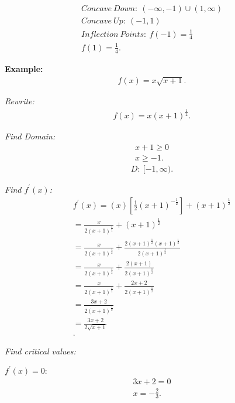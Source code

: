 \documentclass{report}
\begin{document}
  \begin{align*}
    Concave\ Down:\ (-\infty, -1)\cup(1,\infty) \\
    Concave\ Up:\ (-1,1) \\
    Inflection\ Points:\ f(-1) = \frac{1}{4}\\
    f(1) = \frac{1}{4}
  .\end{align*}

  \begin{mdframed}
    \textbf{Example:}
    \begin{align*}
      f(x) = x\sqrt{x+1}
    .\end{align*}
  \end{mdframed}
  \bigbreak \noindent 
  \textit{Rewrite:}
  \begin{align*}
    f(x) = x(x+1)^{\frac{1}{2}}
  .\end{align*}

  \bigbreak \noindent 
  \textit{Find Domain:}
  \begin{align*}
    x+1 \geq 0 \\
    x \geq -1
  .\end{align*}
  \begin{align*}
    D:\ [-1, \infty)
  .\end{align*}

  \bigbreak \noindent 
  \textit{Find $f^{\prime}(x)$:}
  \begin{align*}
    f^{\prime}(x) = (x)[\frac{1}{2}(x+1)^{-\frac{1}{2}}] + (x+1)^{\frac{1}{2}} \\
    = \frac{x}{2(x+1)^{\frac{1}{2}}} + (x+1)^{\frac{1}{2}} \\
    = \frac{x}{2(x+1)^{\frac{1}{2}}} + \frac{2(x+1)^{\frac{1}{2}}(x+1)^{\frac{1}{2}}}{2(x+1)^{\frac{1}{2}}} \\
    = \frac{x}{2(x+1)^{\frac{1}{2}}} + \frac{2(x+1)}{2(x+1)^{\frac{1}{2}}} \\
    = \frac{x}{2(x+1)^{\frac{1}{2}}} + \frac{2x+2}{2(x+1)^{\frac{1}{2}}} \\
    = \frac{3x+2}{2(x+1)^{\frac{1}{2}}} \\
    = \frac{3x+2}{2\sqrt{x+1}} \\
  .\end{align*}

  \bigbreak \noindent 
  \textit{Find critical values:}

  \bigbreak \noindent 
  \textit{$f^{\prime}(x) = 0 $}:
  \begin{align*}
    3x+2 = 0 \\
    \boxed{x = -\frac{2}{3}}
  .\end{align*}
  \bigbreak \noindent 
\end{document}
